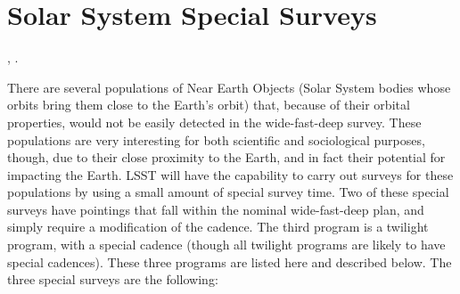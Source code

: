 %
%
%
%
%
%

\section{Solar System Special Surveys}
\def\secname{solar_system_specials}\label{sec:\secname}

,
.



There are several populations of Near Earth Objects (Solar System bodies
whose orbits bring them close to the Earth's orbit) that, because of
their orbital properties, would not be easily detected in the
wide-fast-deep survey. These populations are very interesting for both
scientific and sociological purposes, though, due to their close
proximity to the Earth, and in fact their potential for impacting the
Earth. LSST will have the capability to carry out surveys for these
populations by using a small amount of special survey time. Two of
these special surveys have pointings that fall within the nominal
wide-fast-deep plan, and simply require a modification of the cadence.
The third program is a twilight program, with a special cadence (though
all twilight programs are likely to  have special cadences). These three
programs are listed here and described below. The three special surveys are
the following:

